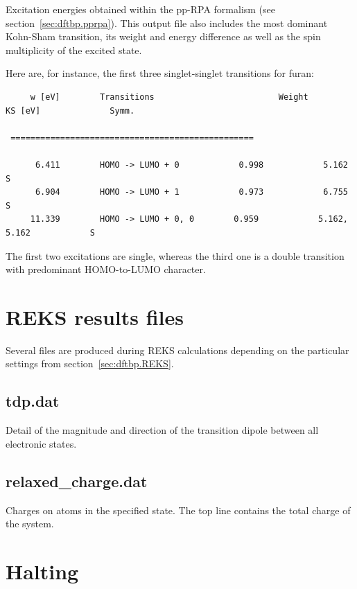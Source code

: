 Excitation energies obtained within the pp-RPA formalism (see
section~\ref{sec:dftbp.pprpa}). This output file also includes the
most dominant Kohn-Sham transition, its weight and energy difference
as well as the spin multiplicity of the excited state.

Here are, for instance, the first three singlet-singlet transitions
for furan:

\begin{verbatim}
     w [eV]        Transitions                         Weight            KS [eV]              Symm.

 =================================================

      6.411        HOMO -> LUMO + 0            0.998            5.162                     S
      6.904        HOMO -> LUMO + 1            0.973            6.755                     S
     11.339        HOMO -> LUMO + 0, 0        0.959            5.162,  5.162            S
\end{verbatim}

The first two excitations are single, whereas the third one is a
double transition with predominant HOMO-to-LUMO character.

\section{REKS results files}
\label{sec:reks_files}
Several files are produced during REKS calculations depending on the
particular settings from section~\ref{sec:dftbp.REKS}.


\subsection{tdp.dat}

Detail of the magnitude and direction of the transition dipole between all electronic states.

\subsection{relaxed\_charge.dat}

Charges on atoms in the specified state. The top line contains the total charge
of the system.

\section{Halting \dftbp{}}
\label{sec:dftbp.HaltFiles}

